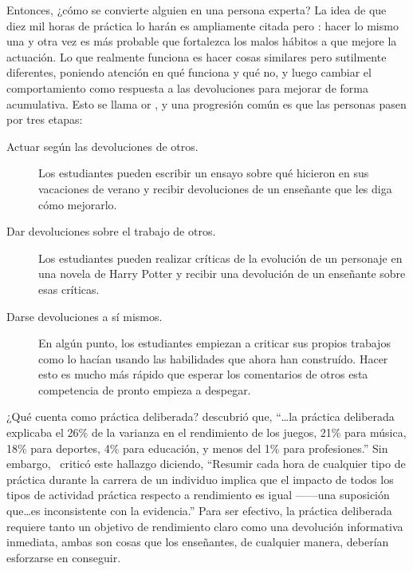 
Entonces, ¿cómo se convierte alguien en una persona experta?
La idea de que diez mil horas de práctica lo harán es ampliamente citada
pero :
hacer lo mismo una y otra vez es más probable que fortalezca los malos hábitos a que mejore la actuación.
Lo que realmente funciona es hacer cosas similares pero sutilmente diferentes,
poniendo atención en qué funciona y qué no,
y luego cambiar el comportamiento como respuesta a las devoluciones para mejorar de forma acumulativa.
Esto se llama 
or ,
y una progresión común es que las personas pasen por tres etapas:

\begin{description}

\item[Actuar según las devoluciones de otros.]
  Los estudiantes pueden escribir un ensayo sobre qué hicieron en sus vacaciones de verano
  y recibir devoluciones de un enseñante que les diga cómo mejorarlo.

\item[Dar devoluciones sobre el trabajo de otros.]
  Los estudiantes pueden realizar críticas de la evolución de un personaje en una novela de  Harry Potter
  y recibir una devolución de un enseñante sobre esas críticas.

\item[Darse devoluciones a sí mismos.]
  En algún punto,
  los estudiantes empiezan a criticar sus propios trabajos como lo hacían 
  usando las habilidades que ahora han construído.
  Hacer esto es mucho más rápido que esperar los comentarios de otros 
  esta competencia de pronto empieza a despegar.

\end{description}

\begin{aside}{¿Qué cuenta como práctica deliberada?}
  \cite{Macn2014} descubrió que,
  ``{\ldots}la práctica deliberada explicaba el 26\% de la varianza en el rendimiento de los juegos,
  21\% para música,
  18\% para deportes,
  4\% para educación,
  y menos del 1\% para profesiones.''
  Sin embargo,~\cite{Eric2016} criticó este hallazgo diciendo,
  ``Resumir cada hora de cualquier tipo de práctica durante la carrera de un individuo
 implica que el impacto de todos los tipos de actividad práctica respecto a  rendimiento es igual ------una suposición
  que{\ldots}es inconsistente con la evidencia.''
  Para ser efectivo,
  la práctica deliberada requiere tanto un objetivo de rendimiento claro
  como una devolución informativa inmediata,
  ambas son cosas que los enseñantes, de cualquier manera, deberían esforzarse en conseguir.
\end{aside}

